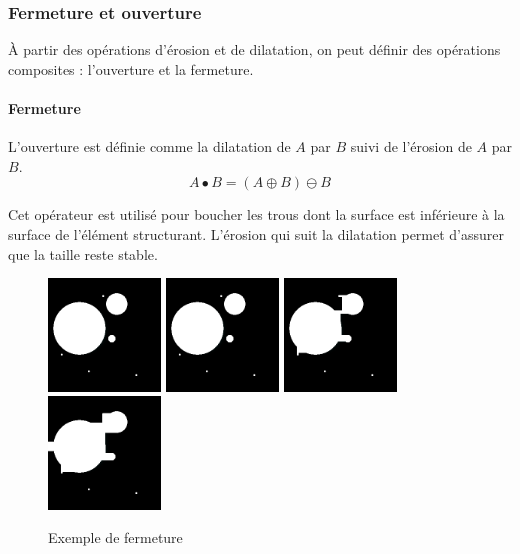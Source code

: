   \subsubsection{Fermeture et ouverture}
  
  À partir des opérations d'érosion et de dilatation, on peut définir des opérations composites : l'ouverture et la fermeture.
  
  \paragraph{Fermeture}
  L'ouverture est définie comme la dilatation de $A$ par $B$ suivi de l'érosion de $A$ par $B$.
  \begin{equation}
   A \bullet B = (A \oplus B) \ominus B
  \end{equation}
  
  Cet opérateur est utilisé pour boucher les trous dont la surface est inférieure à la surface de l'élément structurant. L'érosion qui suit la dilatation permet d'assurer que la taille reste stable.
  
  \begin{figure}[h]
    \centering
    \includegraphics[height=3cm]{Images/morpho_init.png}
    \includegraphics[height=3cm]{Images/morpho_close_k5.png}
    \includegraphics[height=3cm]{Images/morpho_close_k21.png}
    \includegraphics[height=3cm]{Images/morpho_close_k31.png}
    \label{fig:morpho_femerture}
    \caption{Exemple de fermeture}
  \end{figure}
  
